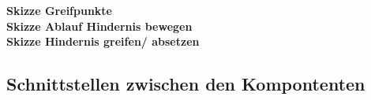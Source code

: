 \textbf{Skizze Greifpunkte} \\
\textbf{Skizze Ablauf Hindernis bewegen}\\
\textbf{Skizze Hindernis greifen/ absetzen}



\subsection{Schnittstellen zwischen den Kompontenten}



